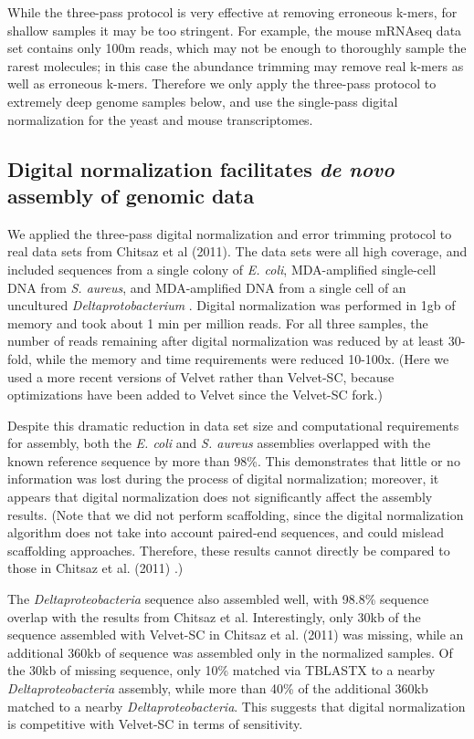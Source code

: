 \documentclass[10pt]{article}
\begin{document}
While the three-pass protocol is very effective at removing erroneous k-mers,
for shallow samples it may be too stringent.  For example, the mouse
mRNAseq data set contains only 100m reads, which may not be enough to
thoroughly sample the rarest molecules; in this case the abundance trimming
may remove real k-mers as well as erroneous k-mers.  Therefore we only
apply the three-pass protocol to extremely deep genome samples below,
and use the single-pass digital normalization for the yeast and mouse transcriptomes.

\subsection*{Digital normalization facilitates {\em de novo} assembly of genomic data}

We applied the three-pass digital normalization and error trimming
protocol to real data sets from Chitsaz et al (2011).  The data sets
were all high coverage, and included sequences from a single colony of
{\em E. coli}, MDA-amplified single-cell DNA from {\em S. aureus}, and
MDA-amplified DNA from a single cell of an uncultured {\em
  Deltaprotobacterium} \cite{pubmed21926975}.  Digital normalization was performed in 1gb of
memory and took about 1 min per million reads.  For all three samples,
the number of reads remaining after digital normalization was reduced
by at least 30-fold, while the memory and time requirements were
reduced 10-100x.  (Here we used a more recent versions of Velvet
rather than Velvet-SC, because optimizations have been added to Velvet
since the Velvet-SC fork.)

Despite this dramatic reduction in data set size and computational
requirements for assembly, both the {\em E. coli} and {\em S. aureus}
assemblies overlapped with the known reference sequence by more than
98\%.  This demonstrates that little or no information was lost during
the process of digital normalization; moreover, it appears that
digital normalization does not significantly affect the assembly results.
(Note that we did not perform scaffolding, since the digital
normalization algorithm does not take into account paired-end
sequences, and could mislead scaffolding approaches.  Therefore, these
results cannot directly be compared to those in Chitsaz et al. (2011)
\cite{pubmedpubmed21926975}.)

The {\em Deltaproteobacteria} sequence also assembled well, with
98.8\% sequence overlap with the results from Chitsaz et al.
Interestingly, only 30kb of the sequence assembled with Velvet-SC in
Chitsaz et al. (2011) was missing, while an additional 360kb of
sequence was assembled only in the normalized samples.  Of the 30kb of
missing sequence, only 10\% matched via TBLASTX to a nearby {\em
  Deltaproteobacteria} assembly, while more than 40\% of the
additional 360kb matched to a nearby {\em Deltaproteobacteria}.  This
suggests that digital normalization is competitive
with Velvet-SC in terms of sensitivity.
\end{document}
